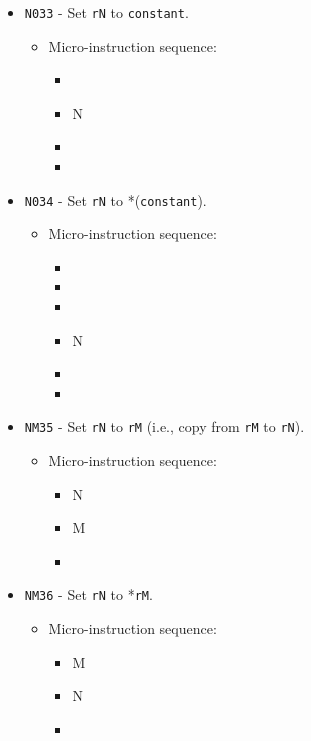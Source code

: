 \documentclass{article}
\begin{document}
\begin{itemize}
    \item \Verb|N033| - Set \Verb|rN| to \Verb|constant|.
    \begin{itemize}
        \item Micro-instruction sequence:
        \begin{itemize}
            \item \pkptroutinc
            \item \datatoreg N
            \item \incrementpk
            \item \done
        \end{itemize}
    \end{itemize}

    \item \Verb|N034| - Set \Verb|rN| to *(\Verb|constant|).
    \begin{itemize}
        \item Micro-instruction sequence:
        \begin{itemize}
            \item \pkptroutinc
            \item \datatotmpa
            \item \tmpaptrout
            \item \datatoreg N
            \item \incrementpk
            \item \done
        \end{itemize}
    \end{itemize}

    \item \Verb|NM35| - Set \Verb|rN| to \Verb|rM| (i.e., copy from \Verb|rM| to \Verb|rN|).
    \begin{itemize}
        \item Micro-instruction sequence:
        \begin{itemize}
            \item \regtodata N
            \item \datatoreg M
            \item \done
        \end{itemize}
    \end{itemize}

    \item \Verb|NM36| - Set \Verb|rN| to *\Verb|rM|.
    \begin{itemize}
        \item Micro-instruction sequence:
        \begin{itemize}
            \item \regptodata M
            \item \datatoreg N
            \item \done
        \end{itemize}
    \end{itemize}
    

\end{itemize}
\end{document}
